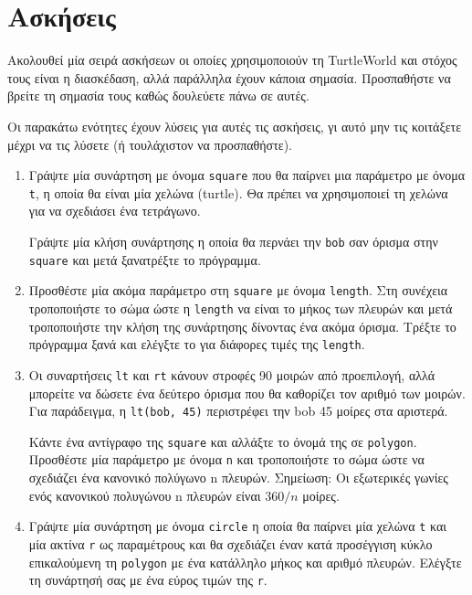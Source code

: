 \documentclass[10pt]{book}
\begin{document}
\section{Ασκήσεις}

Ακολουθεί μία σειρά ασκήσεων οι οποίες χρησιμοποιούν τη TurtleWorld και στόχος τους είναι η διασκέδαση, αλλά παράλληλα έχουν κάποια σημασία. Προσπαθήστε να βρείτε τη σημασία τους καθώς δουλεύετε πάνω σε αυτές.

Οι παρακάτω ενότητες έχουν λύσεις για αυτές τις ασκήσεις, γι αυτό μην τις κοιτάξετε μέχρι να τις λύσετε (ή τουλάχιστον να προσπαθήστε).

\begin{enumerate}

\item Γράψτε μία συνάρτηση με όνομα {\tt square} που θα παίρνει μια παράμετρο με όνομα {\tt t}, η οποία θα είναι μία χελώνα (turtle). Θα πρέπει να χρησιμοποιεί τη χελώνα για να σχεδιάσει
ένα τετράγωνο.

Γράψτε μία κλήση συνάρτησης η οποία θα περνάει την {\tt bob} 
σαν όρισμα στην {\tt square} και μετά ξανατρέξτε το πρόγραμμα.

\item Προσθέστε μία ακόμα παράμετρο στη {\tt square} με όνομα {\tt length}. 
Στη συνέχεια τροποποιήστε το σώμα ώστε η {\tt length} να είναι το μήκος των πλευρών και μετά τροποποιήστε την κλήση της συνάρτησης δίνοντας ένα ακόμα όρισμα. Τρέξτε το πρόγραμμα ξανά και ελέγξτε το για διάφορες τιμές της {\tt length}. 

\item Οι συναρτήσεις {\tt lt} και {\tt rt} κάνουν στροφές 90 μοιρών
από προεπιλογή, αλλά μπορείτε να δώσετε ένα δεύτερο όρισμα που θα
καθορίζει τον αριθμό των μοιρών. Για παράδειγμα, η {\tt lt(bob, 45)} περιστρέφει την bob 45 μοίρες στα αριστερά.

Κάντε ένα αντίγραφο της {\tt square} και αλλάξτε το όνομά της σε 
{\tt polygon}. Προσθέστε μία παράμετρο με όνομα {\tt n} και
τροποποιήστε το σώμα ώστε να σχεδιάζει ένα κανονικό πολύγωνο n πλευρών.
Σημείωση: Οι εξωτερικές γωνίες ενός κανονικού πολυγώνου n πλευρών είναι
$360/n$ μοίρες.

\item Γράψτε μία συνάρτηση με όνομα {\tt circle}  η οποία θα παίρνει μία χελώνα {\tt t} 
και μία ακτίνα {\tt r} ως παραμέτρους και θα σχεδιάζει έναν κατά προσέγγιση κύκλο επικαλούμενη τη 
{\tt polygon} με ένα κατάλληλο μήκος και αριθμό πλευρών. Ελέγξτε τη συνάρτησή σας με ένα εύρος τιμών της 
{\tt r}.


\end{enumerate}
\end{document}
